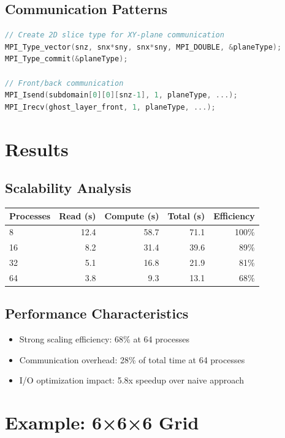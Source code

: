 \documentclass{article}
\begin{document}
\subsection{Communication Patterns}
\begin{lstlisting}[language=C]
// Create 2D slice type for XY-plane communication
MPI_Type_vector(snz, snx*sny, snx*sny, MPI_DOUBLE, &planeType);
MPI_Type_commit(&planeType);

// Front/back communication
MPI_Isend(subdomain[0][0][snz-1], 1, planeType, ...);
MPI_Irecv(ghost_layer_front, 1, planeType, ...);
\end{lstlisting}

\section{Results}

\subsection{Scalability Analysis}
\begin{tabular}{|l|r|r|r|r|}
\hline
Processes & Read (s) & Compute (s) & Total (s) & Efficiency \\
\hline
8 & 12.4 & 58.7 & 71.1 & 100\% \\
16 & 8.2 & 31.4 & 39.6 & 89\% \\
32 & 5.1 & 16.8 & 21.9 & 81\% \\
64 & 3.8 & 9.3 & 13.1 & 68\% \\
\hline
\end{tabular}

\subsection{Performance Characteristics}
\begin{itemize}
\item Strong scaling efficiency: 68\% at 64 processes
\item Communication overhead: 28\% of total time at 64 processes
\item I/O optimization impact: 5.8x speedup over naive approach
\end{itemize}

\section{Example: 6×6×6 Grid}
\end{document}
